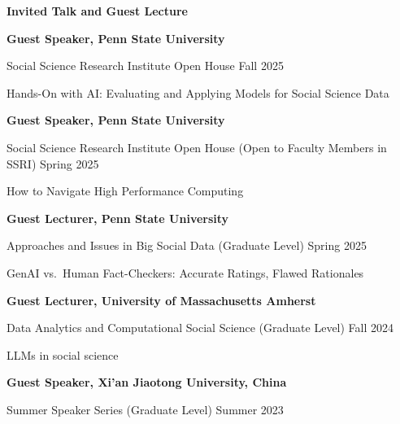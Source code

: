 \documentclass[10.5pt,]{article}
\providecommand{\tightlist}{%
	\setlength{\itemsep}{0pt}\setlength{\parskip}{0pt}}
\renewenvironment{itemize}{
	\begin{list}{}{
			\setlength{\leftmargin}{1.5em}
		}
	}{
	\end{list}
}
\begin{document}
\begin{itemize}
\tightlist
\item
  \textbf{Invited Talk and Guest Lecture}

  \begin{itemize}
  \tightlist
  \item
    \textbf{Guest Speaker, Penn State University}
  \item
    Social Science Research Institute Open House \hfill Fall 2025

    \begin{itemize}
    \tightlist
    \item
      Hands-On with AI: Evaluating and Applying Models for Social
      Science Data
    \end{itemize}
  \item
    \textbf{Guest Speaker, Penn State University}
  \item
    Social Science Research Institute Open House (Open to Faculty
    Members in SSRI) \hfill Spring 2025

    \begin{itemize}
    \tightlist
    \item
      How to Navigate High Performance Computing
    \end{itemize}
  \item
    \textbf{Guest Lecturer, Penn State University}
  \item
    Approaches and Issues in Big Social Data (Graduate Level)
    \hfill Spring 2025

    \begin{itemize}
    \tightlist
    \item
      GenAI vs.~Human Fact-Checkers: Accurate Ratings, Flawed Rationales
    \end{itemize}
  \item
    \textbf{Guest Lecturer, University of Massachusetts Amherst}
  \item
    Data Analytics and Computational Social Science (Graduate Level)
    \hfill Fall 2024

    \begin{itemize}
    \tightlist
    \item
      LLMs in social science
    \end{itemize}
  \item
    \textbf{Guest Speaker, Xi'an Jiaotong University, China}
  \item
    Summer Speaker Series (Graduate Level) \hfill Summer 2023


\end{itemize}
\end{itemize}
\end{document}
